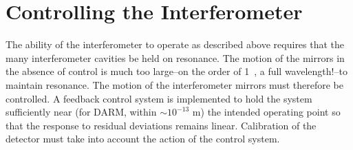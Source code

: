 







\section{Controlling the Interferometer}
The ability of the interferometer to operate as described above
requires that the many interferometer cavities be held on
resonance. The motion of the mirrors in the absence of control is much
too large--on the order of 1~\micron, a full wavelength!--to maintain
resonance.  The motion of the interferometer mirrors must therefore be
controlled.  A feedback control system is implemented to hold the
system sufficiently near (for DARM, within $\sim 10^{-13}$ m) the
intended operating point so that the response to residual deviations
remains linear. Calibration of the detector must take into account the
action of the control system.


